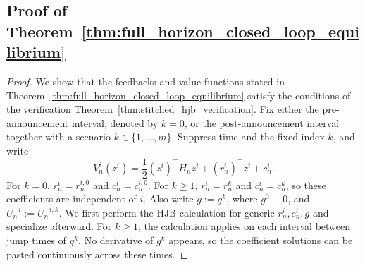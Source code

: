 \documentclass[12pt]{article}
\numberwithin{equation}{section}
\theoremstyle{definition}
\begin{document}
\subsection{Proof of Theorem~\ref{thm:full_horizon_closed_loop_equilibrium}}
\label{subsec:proof_full_horizon_closed_loop_equilibrium}

\begin{proof}
We show that the feedbacks and value functions stated in
Theorem~\ref{thm:full_horizon_closed_loop_equilibrium} satisfy the conditions
of the verification Theorem~\ref{thm:stitched_hjb_verification}.
Fix either the pre-announcement interval, denoted by \(k=0\), or the
post-announcement interval together with a scenario
\(k\in\{1,\ldots,m\}\). Suppress time and the fixed index \(k\), and write
\[
V_n^i(z^i)
=\frac12(z^i)^\top H_nz^i+(r_n^i)^\top z^i+c_n^i.
\]
For \(k=0\), \(r_n^i=r_n^{i,0}\) and \(c_n^i=c_n^{i,0}\). For \(k\geq1\),
\(r_n^i=r_n^k\) and \(c_n^i=c_n^k\), so these coefficients are independent
of \(i\). Also write \(g:=g^k\), where \(g^0\equiv0\), and
\(U_n^{-i}:=U_n^{-i,k}\). We first perform the HJB calculation for generic
\(r_n^i,c_n^i,g\) and specialize afterward. For \(k\geq1\), the calculation
applies on each interval between jump times of \(g^k\). No derivative of
\(g^k\) appears, so the coefficient solutions can be pasted continuously
across these times.


\end{proof}
\end{document}
